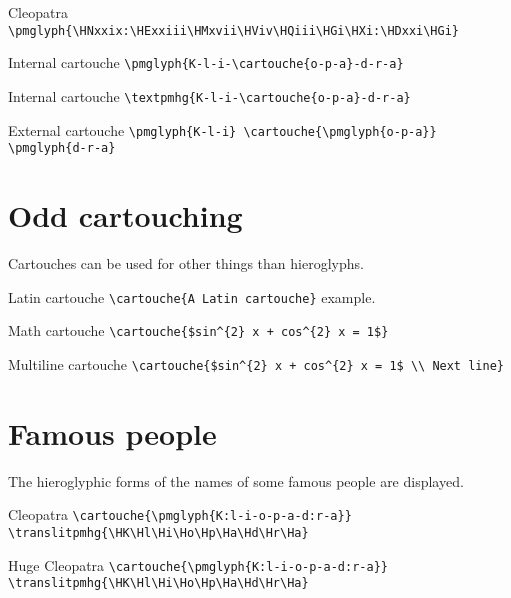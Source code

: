 \documentclass{article}
\begin{document}
Cleopatra \verb|\pmglyph{\HNxxix:\HExxiii\HMxvii\HViv\HQiii\HGi\HXi:\HDxxi\HGi}| 
                \pmglyph{\HNxxix:\HExxiii\HMxvii\HViv\HQiii\HGi\HXi:\HDxxi\HGi} 



Internal cartouche \verb|\pmglyph{K-l-i-\cartouche{o-p-a}-d-r-a}| \\

Internal cartouche \verb|\textpmhg{K-l-i-\cartouche{o-p-a}-d-r-a}| \\

External cartouche \verb|\pmglyph{K-l-i} \cartouche{\pmglyph{o-p-a}} \pmglyph{d-r-a}| \\
           

\section{Odd cartouching}

    Cartouches can be used for other things than hieroglyphs.

Latin cartouche \verb|\cartouche{A Latin cartouche}|
                       example.

Math cartouche \verb|\cartouche{$sin^{2} x + cos^{2} x = 1$}|

Multiline cartouche \verb|\cartouche{$sin^{2} x + cos^{2} x = 1$ \\ Next line}|

\section{Famous people}

    The hieroglyphic forms of the names of some famous people are
displayed.

Cleopatra \verb|\cartouche{\pmglyph{K:l-i-o-p-a-d:r-a}}| \\
\verb|\translitpmhg{\HK\Hl\Hi\Ho\Hp\Ha\Hd\Hr\Ha}| \\
\translitpmhg{\HK\Hl\Hi\Ho\Hp\Ha\Hd\Hr\Ha}

Huge Cleopatra \verb|\cartouche{\pmglyph{K:l-i-o-p-a-d:r-a}}| \\
\verb|\translitpmhg{\HK\Hl\Hi\Ho\Hp\Ha\Hd\Hr\Ha}| \\
\end{document}
